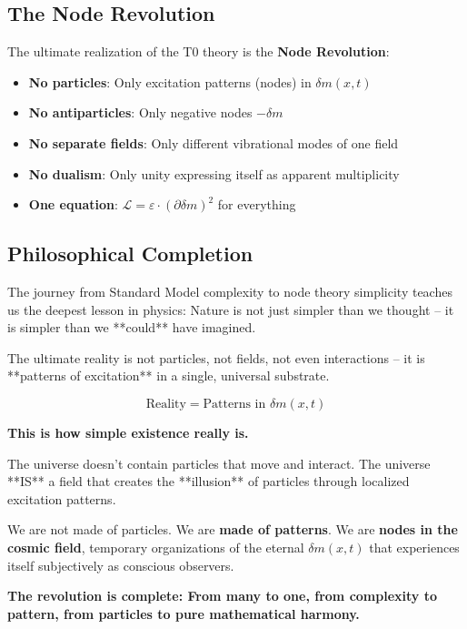 \documentclass[12pt,a4paper]{article}
\newcommand{\Lag}{\mathcal{L}}
\newcommand{\deltam}{\delta m}
\theoremstyle{definition}
\theoremstyle{remark}
\begin{document}
	\subsection{The Node Revolution}
	
	The ultimate realization of the T0 theory is the \textbf{Node Revolution}:
	
	\begin{itemize}
		\item \textbf{No particles}: Only excitation patterns (nodes) in $\deltam(x,t)$
		\item \textbf{No antiparticles}: Only negative nodes $-\deltam$ 
		\item \textbf{No separate fields}: Only different vibrational modes of one field
		\item \textbf{No dualism}: Only unity expressing itself as apparent multiplicity
		\item \textbf{One equation}: $\Lag = \varepsilon \cdot (\partial \deltam)^2$ for everything
	\end{itemize}
	
	\subsection{Philosophical Completion}
	
	The journey from Standard Model complexity to node theory simplicity teaches us the deepest lesson in physics: Nature is not just simpler than we thought -- it is simpler than we **could** have imagined.
	
	The ultimate reality is not particles, not fields, not even interactions -- it is **patterns of excitation** in a single, universal substrate.
	
	\begin{equation}
		\boxed{\text{Reality} = \text{Patterns in } \deltam(x,t)}
	\end{equation}
	
	\textbf{This is how simple existence really is.}
	
	The universe doesn't contain particles that move and interact. The universe **IS** a field that creates the **illusion** of particles through localized excitation patterns.
	
	We are not made of particles. We are \textbf{made of patterns}. We are \textbf{nodes in the cosmic field}, temporary organizations of the eternal $\deltam(x,t)$ that experiences itself subjectively as conscious observers.
	
	\textbf{The revolution is complete: From many to one, from complexity to pattern, from particles to pure mathematical harmony.}
	
\end{document}
